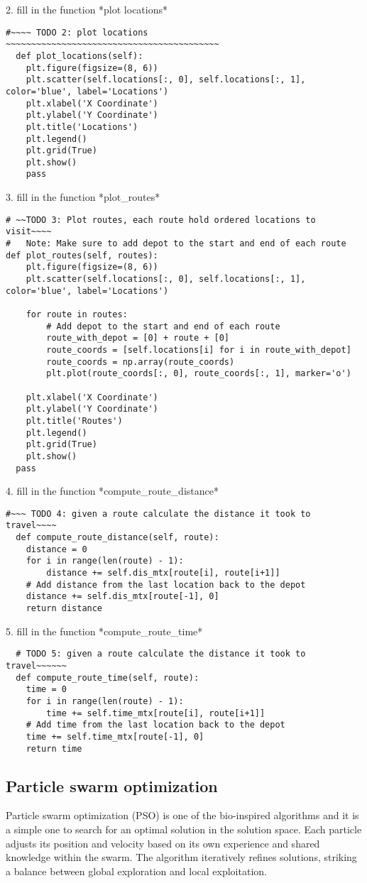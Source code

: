 \documentclass[letterpaper, 12pt]{article}
\begin{document}
2. fill in the function *plot locations*
\begin{lstlisting}
#~~~~ TODO 2: plot locations ~~~~~~~~~~~~~~~~~~~~~~~~~~~~~~~~~~~~~~~~~~
  def plot_locations(self):
    plt.figure(figsize=(8, 6))
    plt.scatter(self.locations[:, 0], self.locations[:, 1], color='blue', label='Locations')
    plt.xlabel('X Coordinate')
    plt.ylabel('Y Coordinate')
    plt.title('Locations')
    plt.legend()
    plt.grid(True)
    plt.show()
    pass
\end{lstlisting}
3. fill in the function *plot\_routes*
\begin{lstlisting}
# ~~TODO 3: Plot routes, each route hold ordered locations to visit~~~~
#   Note: Make sure to add depot to the start and end of each route
def plot_routes(self, routes):
    plt.figure(figsize=(8, 6))
    plt.scatter(self.locations[:, 0], self.locations[:, 1], color='blue', label='Locations')

    for route in routes:
        # Add depot to the start and end of each route
        route_with_depot = [0] + route + [0]
        route_coords = [self.locations[i] for i in route_with_depot]
        route_coords = np.array(route_coords)
        plt.plot(route_coords[:, 0], route_coords[:, 1], marker='o')

    plt.xlabel('X Coordinate')
    plt.ylabel('Y Coordinate')
    plt.title('Routes')
    plt.legend()
    plt.grid(True)
    plt.show()
  pass
\end{lstlisting}
4. fill in the function *compute\_route\_distance*
\begin{lstlisting}
#~~~ TODO 4: given a route calculate the distance it took to travel~~~~
  def compute_route_distance(self, route):
    distance = 0
    for i in range(len(route) - 1):
        distance += self.dis_mtx[route[i], route[i+1]]
    # Add distance from the last location back to the depot
    distance += self.dis_mtx[route[-1], 0]
    return distance
\end{lstlisting}
5. fill in the function *compute\_route\_time*
\begin{lstlisting}
  # TODO 5: given a route calculate the distance it took to travel~~~~~~
  def compute_route_time(self, route):
    time = 0
    for i in range(len(route) - 1):
        time += self.time_mtx[route[i], route[i+1]]
    # Add time from the last location back to the depot
    time += self.time_mtx[route[-1], 0]
    return time
\end{lstlisting}

\subsection*{Particle swarm optimization}
Particle swarm optimization (PSO) is one of the bio-inspired algorithms and it is a simple one to search for an optimal solution in the solution space. Each particle adjusts its position and velocity based on its own experience and shared knowledge within the swarm. The algorithm iteratively refines solutions, striking a balance between global exploration and local exploitation.
\end{document}
